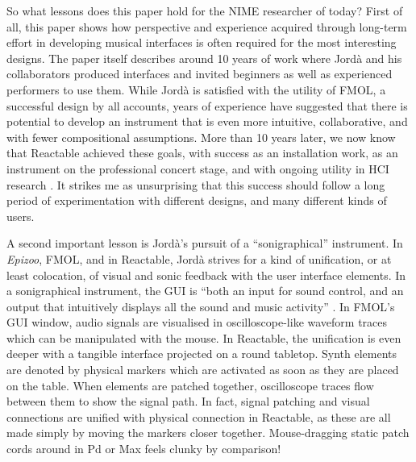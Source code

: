So what lessons does this paper hold for the NIME researcher of today?
First of all, this paper shows how perspective and experience acquired through long-term effort in developing musical interfaces is often required for the most interesting designs. The paper itself describes around 10 years of work where Jord\`{a} and his collaborators produced interfaces and invited beginners as well as experienced performers to use them. While Jord\`{a} is satisfied with the utility of FMOL, a successful design by all accounts, years of experience have suggested that there is potential to develop an instrument that is even more intuitive, collaborative, and with fewer compositional assumptions. More than 10 years later, we now know that Reactable achieved these goals, with success as an installation work, as an instrument on the professional concert stage, and with ongoing utility in HCI research \cite{Xambo:2013}. It strikes me as unsurprising that this success should follow a long period of experimentation with different designs, and many different kinds of users.

A second important lesson is Jord\`{a}'s pursuit of a ``sonigraphical'' instrument. In \textit{Epizoo}, FMOL, and in Reactable, Jord\`{a} strives for a kind of unification, or at least colocation, of visual and sonic feedback with the user interface elements. In a sonigraphical instrument, the GUI is ``both an input for sound control, and an output that intuitively displays all the sound and music activity'' \cite{Jorda:2003a}. In FMOL's GUI window, audio signals are visualised in oscilloscope-like waveform traces which can be manipulated with the mouse. In Reactable, the unification is even deeper with a tangible interface projected on a round tabletop. Synth elements are denoted by physical markers which are activated as soon as they are placed on the table. When elements are patched together, oscilloscope traces flow between them to show the signal path. In fact, signal patching and visual connections are unified with physical connection in Reactable, as these are all made simply by moving the markers closer together. Mouse-dragging static patch cords around in Pd or Max feels clunky by comparison!

